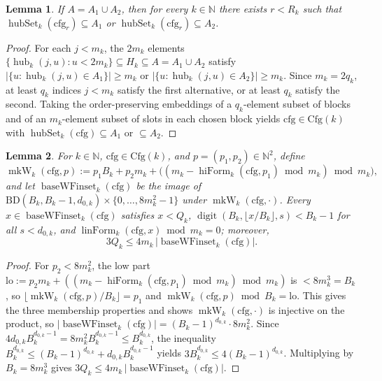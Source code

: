 \documentclass[11pt,a4paper]{amsart}
\newtheorem{lemma}{Lemma}
\newcommand{\digit}{\operatorname{digit}}
\newcommand{\linForm}{\operatorname{linForm}}
\newcommand{\hiForm}{\operatorname{hiForm}}
\newcommand{\hub}{\operatorname{hub}}
\newcommand{\hubSet}{\operatorname{hubSet}}
\newcommand{\mkW}{\operatorname{mkW}}
\newcommand{\baseW}{\operatorname{baseWFinset}}
\begin{document}
\begin{lemma}\label{lem:pigeonhole}
If $A = A_1 \cup A_2$, then for every $k \in \mathbb{N}$ there exists $r < R_k$ such that $\hubSet_k(\mathrm{cfg}_r) \subseteq A_1$ or $\hubSet_k(\mathrm{cfg}_r) \subseteq A_2$.
\end{lemma}

\begin{proof}
For each $j < m_k$, the $2 m_k$ elements $\{\hub_k(j, u) : u < 2 m_k\} \subseteq H_k \subseteq A = A_1 \cup A_2$ satisfy $|\{u : \hub_k(j, u) \in A_1\}| \ge m_k$ or $|\{u : \hub_k(j, u) \in A_2\}| \ge m_k$. Since $m_k = 2 q_k$, at least $q_k$ indices $j < m_k$ satisfy the first alternative, or at least $q_k$ satisfy the second. Taking the order-preserving embeddings of a $q_k$-element subset of blocks and of an $m_k$-element subset of slots in each chosen block yields $\mathrm{cfg} \in \mathrm{Cfg}(k)$ with $\hubSet_k(\mathrm{cfg}) \subseteq A_1$ or $\subseteq A_2$.
\end{proof}

\begin{lemma}\label{lem:baseW}
For $k \in \mathbb{N}$, $\mathrm{cfg} \in \mathrm{Cfg}(k)$, and $p = (p_1, p_2) \in \mathbb{N}^2$, define
\[
\mkW_k(\mathrm{cfg}, p) := p_1 B_k + p_2 m_k + \bigl((m_k - \hiForm_k(\mathrm{cfg}, p_1) \bmod m_k) \bmod m_k\bigr),
\]
and let $\baseW_k(\mathrm{cfg})$ be the image of $\mathrm{BD}(B_k, B_k - 1, d_{0,k}) \times \{0, \dots, 8 m_k^2 - 1\}$ under $\mkW_k(\mathrm{cfg}, \cdot)$. Every $x \in \baseW_k(\mathrm{cfg})$ satisfies $x < Q_k$, $\digit(B_k, \lfloor x / B_k \rfloor, s) < B_k - 1$ for all $s < d_{0,k}$, and $\linForm_k(\mathrm{cfg}, x) \bmod m_k = 0$; moreover,
\[
3 Q_k \le 4 m_k \, |\baseW_k(\mathrm{cfg})|.
\]
\end{lemma}

\begin{proof}
For $p_2 < 8 m_k^2$, the low part $\mathrm{lo} := p_2 m_k + ((m_k - \hiForm_k(\mathrm{cfg}, p_1) \bmod m_k) \bmod m_k)$ is $< 8 m_k^3 = B_k$, so $\lfloor \mkW_k(\mathrm{cfg}, p) / B_k \rfloor = p_1$ and $\mkW_k(\mathrm{cfg}, p) \bmod B_k = \mathrm{lo}$. This gives the three membership properties and shows $\mkW_k(\mathrm{cfg}, \cdot)$ is injective on the product, so $|\baseW_k(\mathrm{cfg})| = (B_k - 1)^{d_{0,k}} \cdot 8 m_k^2$. Since $4 d_{0,k} B_k^{d_{0,k} - 1} = 8 m_k^2 B_k^{d_{0,k} - 1} \le B_k^{d_{0,k}}$, the inequality $B_k^{d_{0,k}} \le (B_k - 1)^{d_{0,k}} + d_{0,k} B_k^{d_{0,k} - 1}$ yields $3 B_k^{d_{0,k}} \le 4 (B_k - 1)^{d_{0,k}}$. Multiplying by $B_k = 8 m_k^3$ gives $3 Q_k \le 4 m_k \, |\baseW_k(\mathrm{cfg})|$.
\end{proof}
\end{document}
